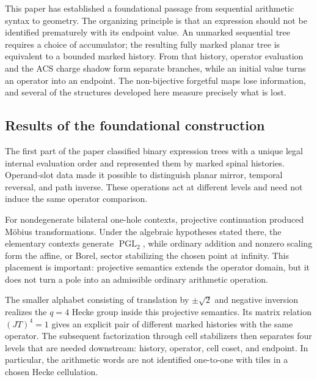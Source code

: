 This paper has established a foundational passage from sequential arithmetic
syntax to geometry.  The organizing principle is that an expression should not
be identified prematurely with its endpoint value.  An unmarked sequential tree
requires a choice of accumulator; the resulting fully marked planar tree is
equivalent to a bounded marked history.  From that history, operator evaluation
and the ACS charge shadow form separate branches, while an initial value turns an
operator into an endpoint.  The non-bijective forgetful maps lose information, and
several of the structures developed here measure precisely what is lost.

\subsection{Results of the foundational construction}

The first part of the paper classified binary expression trees with a unique
legal internal evaluation order and represented them by marked spinal
histories.  Operand-slot data made it possible to distinguish planar mirror,
temporal reversal, and path inverse.  These operations act at different levels
and need not induce the same operator comparison.

For nondegenerate bilateral one-hole contexts, projective continuation produced
M\"obius transformations.  Under the algebraic hypotheses stated there, the
elementary contexts generate \(\operatorname{PGL}_2\), while ordinary
addition and nonzero scaling form the affine, or Borel, sector stabilizing the
chosen point at infinity.  This placement is important: projective semantics
extends the operator domain, but it does not turn a pole into an admissible
ordinary arithmetic operation.

The smaller alphabet consisting of translation by $\pm\sqrt2$ and negative
inversion realizes the $q=4$ Hecke group inside this projective semantics.  Its
matrix relation $(JT)^4=1$ gives an explicit pair of different marked histories
with the same operator.  The subsequent factorization through cell stabilizers
then separates four levels that are needed downstream: history, operator, cell
coset, and endpoint.  In particular, the arithmetic words are not identified
one-to-one with tiles in a chosen Hecke cellulation.

